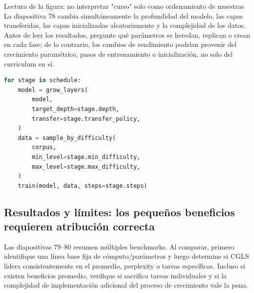 \begin{knowledgebox}{Lectura de la figura: no interpretar "curso" solo como ordenamiento de muestras}
La diapositiva 78 cambia simultáneamente la profundidad del modelo, las capas transferidas, las capas inicializadas aleatoriamente y la complejidad de los datos. Antes de leer los resultados, pregunte qué parámetros se heredan, replican o crean en cada fase; de lo contrario, los cambios de rendimiento podrían provenir del crecimiento paramétrico, pasos de entrenamiento o inicialización, no solo del curriculum en sí.
\end{knowledgebox}

\begin{lstlisting}[language=Python,caption={Pseudocódigo para el schedule conjunto de profundidad del modelo y dificultad de datos}]
for stage in schedule:
    model = grow_layers(
        model,
        target_depth=stage.depth,
        transfer=stage.transfer_policy,
    )
    data = sample_by_difficulty(
        corpus,
        min_level=stage.min_difficulty,
        max_level=stage.max_difficulty,
    )
    train(model, data, steps=stage.steps)
\end{lstlisting}

\subsection{Resultados y límites: los pequeños beneficios requieren atribución correcta}

Las diapositivas 79--80 resumen múltiples benchmarks. Al comparar, primero identifique una línea base fija de cómputo/parámetros y luego determine si CGLS lidera consistentemente en el promedio, perplexity o tareas específicas. Incluso si existen beneficios promedio, verifique si sacrifica tareas individuales y si la complejidad de implementación adicional del proceso de crecimiento vale la pena.





